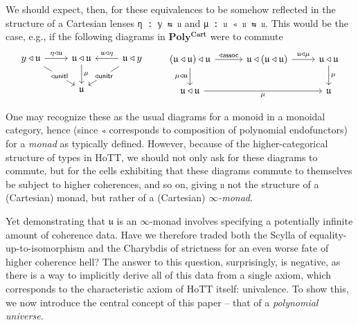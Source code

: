 \documentclass[
  11pt,
  oneside,
  article]{memoir}
\theoremstyle{definition}
\theoremstyle{plain}
\newcommand{\0}{\textsf{0}}
\newcommand{\1}{\tn{\textsf{1}}}
\begin{document}
We should expect, then, for these equivalences to be somehow reflected
in the structure of a Cartesian lenses \texttt{η\ :\ 𝕪\ ⇆\ 𝔲} and
\texttt{μ\ :\ 𝔲\ ◃\ 𝔲\ ⇆\ 𝔲}. This would be the case, e.g., if the
following diagrams in \(\mathbf{Poly^{Cart}}\) were to commute \[
\begin{tikzcd}
    {y \triangleleft \mathfrak{u}} & {\mathfrak{u} \triangleleft \mathfrak{u} } & {\mathfrak{u} \triangleleft y} \\
    & {\mathfrak{u}}
    \arrow["{\eta \triangleleft \mathfrak{u}}", from=1-1, to=1-2]
    \arrow["{\mathsf{\triangleleft unitl}}"{description}, from=1-1, to=2-2]
    \arrow["\mu", from=1-2, to=2-2]
    \arrow["{\mathfrak{u} \triangleleft \eta}"', from=1-3, to=1-2]
    \arrow["{\mathsf{\triangleleft unitr}}"{description}, from=1-3, to=2-2]
\end{tikzcd} \qquad \begin{tikzcd}
    {(\mathfrak{u} \triangleleft \mathfrak{u}) \triangleleft \mathfrak{u}} &[5pt]{\mathfrak{u} \triangleleft (\mathfrak{u} \triangleleft \mathfrak{u})} & {\mathfrak{u} \triangleleft \mathfrak{u}} \\
    {\mathfrak{u} \triangleleft \mathfrak{u}} && {\mathfrak{u}}
    \arrow["{\mathsf{\triangleleft assoc}}", from=1-1, to=1-2]
    \arrow["{\mu \triangleleft \mathfrak{u}}"', from=1-1, to=2-1]
    \arrow["{\mathfrak{u} \triangleleft \mu}", from=1-2, to=1-3]
    \arrow["\mu", from=1-3, to=2-3]
    \arrow["\mu"', from=2-1, to=2-3]
\end{tikzcd}
\]

One may recognize these as the usual diagrams for a monoid in a monoidal
category, hence (since \texttt{◃} corresponds to composition of
polynomial endofunctors) for a \emph{monad} as typically defined.
However, because of the higher-categorical structure of types in HoTT,
we should not only ask for these diagrams to commute, but for the cells
exhibiting that these diagrams commute to themselves be subject to
higher coherences, and so on, giving \texttt{𝔲} not the structure of a
(Cartesian) monad, but rather of a (Cartesian) \emph{\(\infty\)-monad}.

Yet demonstrating that \(𝔲\) is an \(\infty\)-monad involves specifying
a potentially infinite amount of coherence data. Have we therefore
traded both the Scylla of equality-up-to-isomorphism and the Charybdis
of strictness for an even worse fate of higher coherence hell? The
answer to this question, surprisingly, is negative, as there is a way to
implicitly derive all of this data from a single axiom, which
corresponds to the characteristic axiom of HoTT itself: univalence. To
show this, we now introduce the central concept of this paper -- that of
a \emph{polynomial universe}.
\end{document}
